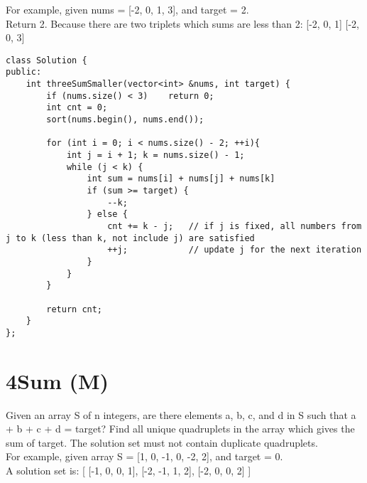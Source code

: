 For example, given nums = [-2, 0, 1, 3], and target = 2.\\

Return 2. Because there are two triplets which sums are less than 2:
[-2, 0, 1]
[-2, 0, 3]\\

\begin{lstlisting}
class Solution {
public:
    int threeSumSmaller(vector<int> &nums, int target) {
        if (nums.size() < 3)    return 0;
        int cnt = 0;
        sort(nums.begin(), nums.end());
        
        for (int i = 0; i < nums.size() - 2; ++i){
            int j = i + 1; k = nums.size() - 1;
            while (j < k) {
                int sum = nums[i] + nums[j] + nums[k]
                if (sum >= target) {
                    --k;
                } else {
                    cnt += k - j;   // if j is fixed, all numbers from j to k (less than k, not include j) are satisfied
                    ++j;            // update j for the next iteration
                }
            }
        }
        
        return cnt;
    }
};
\end{lstlisting}


\section{4Sum (M)}
Given an array S of n integers, are there elements a, b, c, and d in S such that a + b + c + d = target? Find all unique quadruplets in the array which gives the sum of target. The solution set must not contain duplicate quadruplets.\\

For example, given array S = [1, 0, -1, 0, -2, 2], and target = 0.\\
A solution set is:
[
  [-1,  0, 0, 1],
  [-2, -1, 1, 2],
  [-2,  0, 0, 2]
]\\

